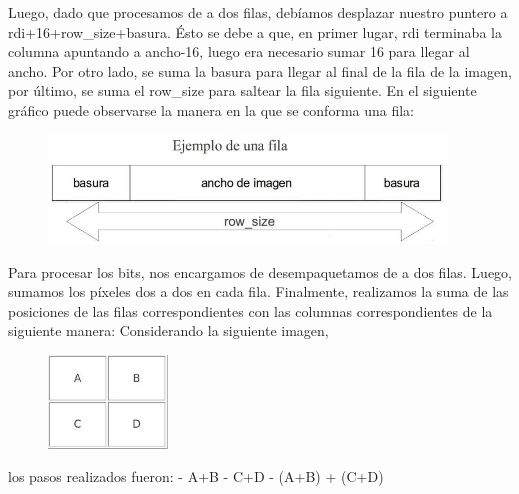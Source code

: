 \documentclass[10pt, a4paper]{article}
\begin{document}
\begin{itemize}
Luego, dado que procesamos de a dos filas, debíamos desplazar nuestro puntero a rdi+16+row\_size+basura. Ésto se debe a que, en primer lugar, rdi terminaba la columna apuntando a ancho-16, luego era necesario sumar 16 para llegar al ancho. Por otro lado, se suma la basura para llegar al final de la fila de la imagen, por último, se suma el row\_size para saltear la fila siguiente. En el siguiente gráfico puede observarse la manera en la que se conforma una fila:\newline
\begin{figure}[H] %
\begin{center}
\includegraphics[width=300pt]{./fila.jpg}
\end{center}
\end{figure}
Para procesar los bits, nos encargamos de desempaquetamos de a dos filas. Luego, sumamos los píxeles dos a dos en cada fila. Finalmente, realizamos la suma de las posiciones de las filas correspondientes con las columnas correspondientes de la siguiente manera:\newline
\newline
Considerando la siguiente imagen,
\begin{figure}[H] %
\begin{center}
\includegraphics[width=90pt]{./suma.jpg}
\end{center}
\end{figure}
los pasos realizados fueron:\newline
- A+B\newline
- C+D\newline
- (A+B) + (C+D)\newline


\end{itemize}
\end{document}
